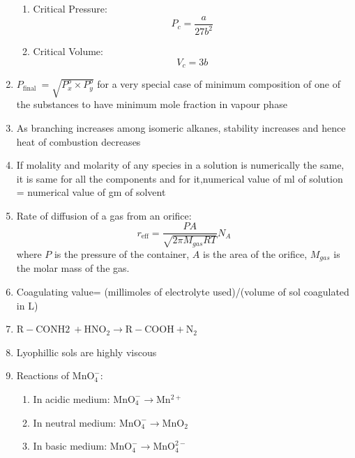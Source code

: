 \documentclass{article}
\numberwithin{equation}{section}
\numberwithin{figure}{section}
\begin{document}
\begin{enumerate}
\begin{enumerate}
			\item Critical Pressure:
				\begin{equation}
					P_{c}=\frac{a}{27b^2}
				\end{equation}
			\item Critical Volume:
				\begin{equation}
					V_{c}=3b
				\end{equation}
		\end{enumerate}
	\item $ P_{\text {final }}=\sqrt{P_{x}^{o} \times P_{y}^{o}}$ for a very special case of minimum composition of one of the substances to have minimum mole fraction in vapour phase
	\item As branching increases among isomeric alkanes, stability increases and hence heat of combustion decreases

	\item If molality and molarity of any species in a solution is numerically the same, it is same for all the components and for it,numerical value of ml of solution = numerical value of gm of solvent
	\item Rate of diffusion of a gas from an orifice:
		\begin{equation}
			r_{\text{eff}}=\frac{P A}{\sqrt{2\pi M_{gas}RT}}N_{A}
		\end{equation}
		where $P$ is the pressure of the container, $A$ is the area of the orifice, $M_{gas}$ is the molar mass of the gas. 
	\item Coagulating value= (millimoles of electrolyte used)/(volume of sol coagulated in L)  
	\item $\mathrm{R-CONH2\ + HNO_2\rightarrow R-COOH+N_2}$
	\item Lyophillic sols are highly viscous
	\item Reactions of $\mathrm{MnO_{4}^{-}}$:
		\begin{enumerate}
			\item In acidic medium: $\mathrm{MnO_{4}^{-} \rightarrow Mn^{2+}}$
			\item In neutral medium: $\mathrm{MnO_{4}^{-} \rightarrow MnO_2}$
			\item In basic medium: $\mathrm{MnO_{4}^{-} \rightarrow MnO_4^{2-}}$


\end{enumerate}
\end{enumerate}
\end{document}
